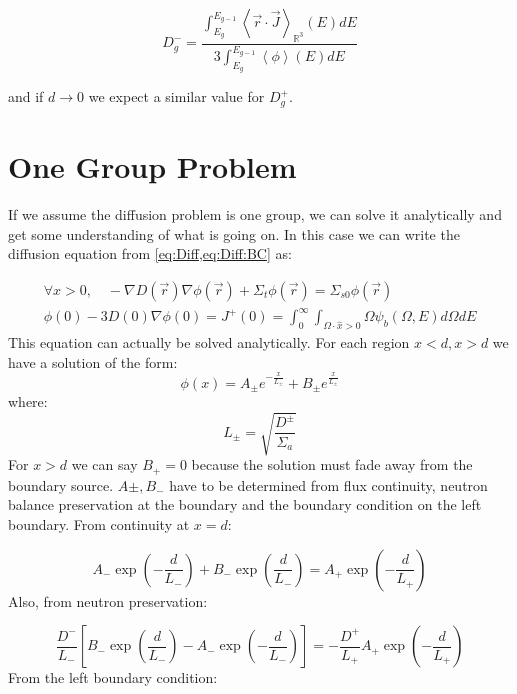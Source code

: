 \documentclass[a4paper,letterpaper,12pt,oneside,draft]{article}
\newcommand{\allspace}{\ensuremath{\mathbb{R}^3}}
\newcommand{\bracket}[1]{\ensuremath{\left\langle #1 \right\rangle}}
\newcommand{\bracketR}[1]{\ensuremath{\bracket{#1}_{\allspace}}}
\newcommand{\rdotJ}{\bracketR{\vec{r}\cdot\vec{J}}}
\newcommand{\intg}[2][g]{\ensuremath{\int_{E_{#1}}^{E_{#1-1}} #2 dE}}
\newcommand{\vr}{\ensuremath{\vec{r}}}
\begin{document}
    \begin{equation*}
        D^-_g = \frac{\intg{\rdotJ(E)}}{3\intg{\bracket{\phi}(E)}}
    \end{equation*}
    
    and if $d\to0$ we expect a similar value for $D_g^+$.
    
\section{One Group Problem}
    If we assume the diffusion problem is one group, we can solve it analytically and get some understanding of what is going on. In this case we can write the diffusion equation from \cref{eq:Diff,eq:Diff:BC} as:
    
    \begin{gather}
    \label{eq:Diff:1G}
        \forall x>0, \quad-\nabla D(\vr)\nabla\phi(\vr) + \Sigma_{t}\phi(\vr) = \Sigma_{s0}\phi(\vr) \\
        \label{eq:Diff:1G:BC}
        \phi(0) - 3D(0)\nabla\phi(0) = J^+(0) = \int_0^\infty{\int_{\Omega\cdot\hat{x}>0}\Omega\psi_b(\Omega,E)d\Omega}dE
    \end{gather}
    This equation can actually be solved analytically. For each region $x<d,x>d$ we have a solution of the form:
    \begin{equation*}
        \phi(x) = A_\pm e^{-\frac{x}{L_\pm}}+B_\pm e^{\frac{x}{L_\pm}}
    \end{equation*}
    where: 
    \begin{equation}
    \label{eq:def:L}
    L_\pm = \sqrt{\frac{D^\pm}{\Sigma_a}}
    \end{equation}
    For $x>d$ we can say $B_+=0$ because the solution must fade away from the boundary source. $A\pm, B_-$ have to be determined from flux continuity, neutron balance preservation at the boundary and the boundary condition on the left boundary. From continuity at $x=d$:
    
    \begin{equation}
    \label{eq:Diff:1G:Continuity}
        A_- \exp\left(-\frac{d}{L_-}\right) + B_-\exp\left(\frac{d}{L_-}\right) = A_+\exp\left(-\frac{d}{L_+}\right)
    \end{equation}
    Also, from neutron preservation:
    
    \begin{equation}
    \label{eq:Diff:1G:BoundaryBalance}
        \frac{D^-}{L_-}\left[B_-\exp\left(\frac{d}{L_-}\right) - A_- \exp\left(-\frac{d}{L_-}\right)\right] = -\frac{D^+}{L_+}A_+ \exp\left(-\frac{d}{L_+}\right)
    \end{equation}
    From the left boundary condition:
    
\end{document}
